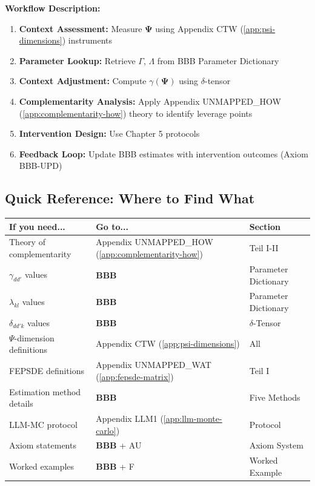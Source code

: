 \documentclass[11pt,a4paper]{article}
\theoremstyle{definition}
\begin{document}
\textbf{Workflow Description:}
\begin{enumerate}
    \item \textbf{Context Assessment:} Measure $\boldsymbol{\Psi}$ using Appendix CTW (\ref{app:psi-dimensions}) instruments
    \item \textbf{Parameter Lookup:} Retrieve $\Gamma$, $\Lambda$ from BBB Parameter Dictionary
    \item \textbf{Context Adjustment:} Compute $\gamma(\boldsymbol{\Psi})$ using $\delta$-tensor
    \item \textbf{Complementarity Analysis:} Apply Appendix UNMAPPED_HOW (\ref{app:complementarity-how}) theory to identify leverage points
    \item \textbf{Intervention Design:} Use Chapter 5 protocols
    \item \textbf{Feedback Loop:} Update BBB estimates with intervention outcomes (Axiom BBB-UPD)
\end{enumerate}

\subsection{Quick Reference: Where to Find What}

\begin{center}
\begin{tabular}{lll}
\toprule
\textbf{If you need...} & \textbf{Go to...} & \textbf{Section} \\
\midrule
Theory of complementarity & Appendix UNMAPPED_HOW (\ref{app:complementarity-how}) & Teil I-II \\
$\gamma_{dd'}$ values & \textbf{BBB} & Parameter Dictionary \\
$\lambda_{kl}$ values & \textbf{BBB} & Parameter Dictionary \\
$\delta_{dd'k}$ values & \textbf{BBB} & $\delta$-Tensor \\
$\Psi$-dimension definitions & Appendix CTW (\ref{app:psi-dimensions}) & All \\
FEPSDE definitions & Appendix UNMAPPED_WAT (\ref{app:fepsde-matrix}) & Teil I \\
Estimation method details & \textbf{BBB} & Five Methods \\
LLM-MC protocol & Appendix LLM1 (\ref{app:llm-monte-carlo}) & Protocol \\
Axiom statements & \textbf{BBB} + AU & Axiom System \\
Worked examples & \textbf{BBB} + F & Worked Example \\
\bottomrule
\end{tabular}
\end{center}
\end{document}
